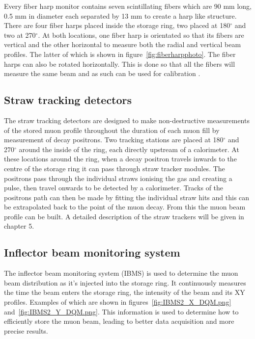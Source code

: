 Every fiber harp monitor contains seven scintillating fibers which are 90 mm long, 0.5 mm in diameter each separated by 13 mm to create a harp like structure. There are four fiber harps placed inside the storage ring, two placed at 180$^{\circ}$ and two at 270$^{\circ}$. At both locations, one fiber harp is orientated so that its fibers are vertical and the other horizontal to measure both the radial and vertical beam profiles. The latter of which is shown in figure~\ref{fig:fiberharpphoto}. The fiber harps can also be rotated horizontally. This is done so that all the fibers will measure the same beam and as such can be used for calibration \cite{fiberref1}.

\subsection{Straw tracking detectors}

The straw tracking detectors are designed to make non-destructive measurements of the stored muon profile throughout the duration of each muon fill by measurement of decay positrons. Two tracking stations are placed at 180$^{\circ}$ and 270$^{\circ}$ around the inside of the ring, each directly upstream of a calorimeter. At these locations around the ring, when a decay positron travels inwards to the centre of the storage ring it can pass through straw tracker modules. The positrons pass through the individual straws ionising the gas and creating a pulse, then travel onwards to be detected by a calorimeter. Tracks of the positrons path can then be made by fitting the individual straw hits and this can be extrapolated back to the point of the muon decay. From this the muon beam profile can be built. A detailed description of the straw trackers will be given in chapter 5.

\subsection{Inflector beam monitoring system}

The inflector beam monitoring system (IBMS) is used to determine the muon beam distribution as it's injected into the storage ring. It continuously measures the time the beam enters the storage ring, the intensity of the beam and its XY profiles. Examples of which are shown in figures~\ref{fig:IBMS2_X_DQM.png} and~\ref{fig:IBMS2_Y_DQM.png}. This information is used to determine how to efficiently store the muon beam, leading to better data acquisition and more precise results. 

